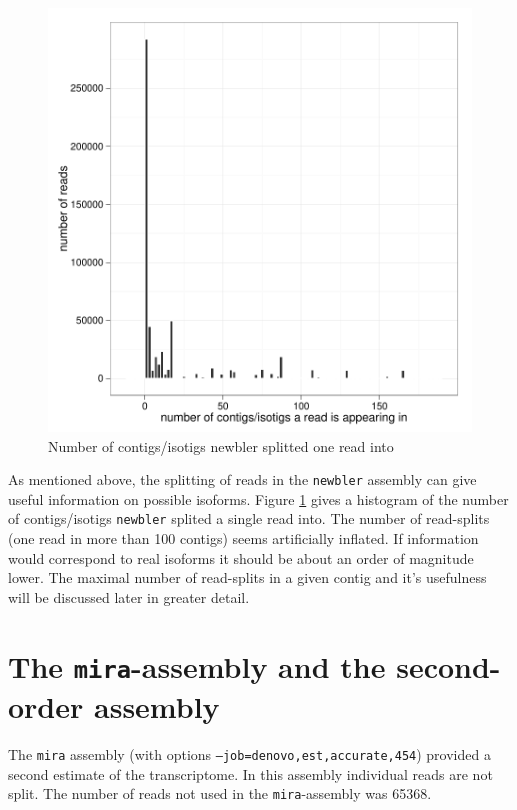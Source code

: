 \documentclass[12pt,a4paper]{article}
\begin{document}
\newpage
  

\begin{figure}[H]
  \centering
  
\includegraphics{Method-008}

  \caption{Number of contigs/isotigs newbler splitted one read into}
  \label{fig:newdist}
\end{figure}

As mentioned above, the splitting of reads in the \texttt{newbler}
assembly can give useful information on possible isoforms. Figure
\ref{fig:newdist} gives a histogram of the number of contigs/isotigs
\texttt{newbler} splited a single read into. The number of read-splits
(one read in more than 100 contigs) seems artificially inflated. If
information would correspond to real isoforms it should be about an
order of magnitude lower. The maximal number of read-splits in a given
contig and it's usefulness will be discussed later in greater detail.

\section{The \texttt{mira}-assembly and the second-order assembly}
\label{sec:assembly-sec}

The \texttt{mira} assembly (with options
\texttt{--job=denovo,est,accurate,454}) provided a second estimate of
the transcriptome. In this assembly individual reads are not
split. The number of reads not used in the \texttt{mira}-assembly was
65368.
\end{document}
